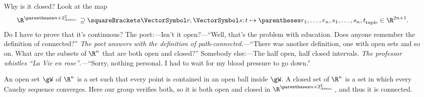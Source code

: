 \documentclass[10pt, a4paper, twoside]{lecturenotes}
\newcommand{\Rn}{{\R^n}}
\begin{document}
Why is it closed? Look at the map\[
\FunctionBody{\R^{\pa{n+2}^2}\Superset\Helt \vr \vs t} {\tuple{r_1,\dotsc,r_n,s_1,\dotsc,s_n,t}\in\R^{2n+1}}\text.
\]
Do I have to prove that it's continuous? 
The poet:---Isn't it open?---``Well, that's the problem with education. Does anyone remember the definition of connected?'' \emph{The poet answers with the definition of path-connected}.---``There was another definition, one with open sets and so on. What are the subsets of $\Rn$ that are both open and closed?'' Somebody else:---The half open, half closed intervals. \emph{The professor whistles ``La Vie en rose''}.---``Sorry, nothing personal. I had to wait for my blood pressure to go down.''

An open set $\gW$ of $\Rn$ is a set such that every point is contained in an open ball inside $\gW$. A closed set of  $\Rn$ is a set in which every Cauchy sequence converges. Here our group verifies both, so it is both open and closed in $\R^{\pa{n+2}^2}$, and thus it is connected.
\end{document}
